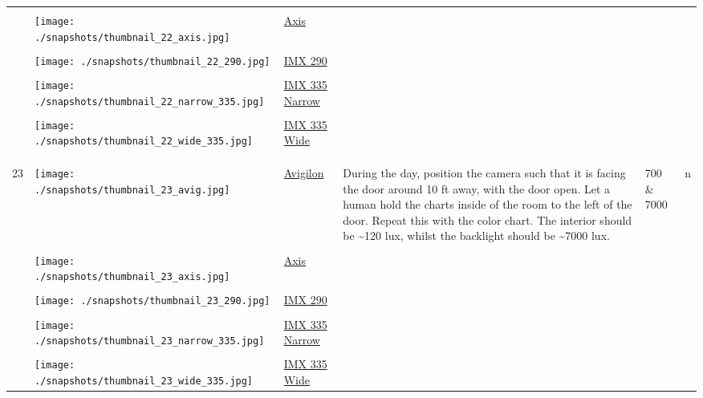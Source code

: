 \documentclass{article}%
\begin{document}
\begin{longtabu}{m{2.5cm} m{4cm} m{2cm} m{4cm} m{2cm} m{2cm}}
&&&&&\\%
&\texttt{[image: ./snapshots/thumbnail\_22\_axis.jpg]}&\href{https://drive.google.com/file/d/1QE_D4jp30H5IkQ-CFucln0C0tDE3zuZd/view?usp=sharing}{Axis}&&&\\%
&&&&&\\%
&\texttt{[image: ./snapshots/thumbnail\_22\_290.jpg]}&\href{https://drive.google.com/file/d/1QqgNPHyQwv9j8qK46wD3WE18JhpdGj23/view?usp=sharing}{IMX 290}&&&\\%
&&&&&\\%
&\texttt{[image: ./snapshots/thumbnail\_22\_narrow\_335.jpg]}&\href{https://drive.google.com/file/d/1tzpYV7sOVIPM0OkLSnX-huiZMO4an3v1/view?usp=sharing}{IMX 335 Narrow}&&&\\%
&&&&&\\%
&\texttt{[image: ./snapshots/thumbnail\_22\_wide\_335.jpg]}&\href{https://drive.google.com/file/d/1E1989-HHUTQs4rtA9rb57YyURvBaEC7e/view?usp=sharing}{IMX 335 Wide}&&&\\%
&&&&&\\%
&&&&&\\%
\hline%
&&&&&\\%
23&\texttt{[image: ./snapshots/thumbnail\_23\_avig.jpg]}&\href{https://drive.google.com/file/d/1SsXcva3ULX97691tGevxNvW2xPXNAJB0/view?usp=sharing}{Avigilon}&During the day, position the camera such that it is facing the door around 10 ft away, with the door open. Let a human hold the charts inside of the room to the left of the door. Repeat this with the color chart. The interior should be \textasciitilde{}120 lux, whilst the backlight should be \textasciitilde{}7000 lux.&700 \& 7000&n\\%
&&&&&\\%
&\texttt{[image: ./snapshots/thumbnail\_23\_axis.jpg]}&\href{https://drive.google.com/file/d/1sVZjZFd9rZ0QAYftB59ZnkrirvaVn7Dd/view?usp=sharing}{Axis}&&&\\%
&&&&&\\%
&\texttt{[image: ./snapshots/thumbnail\_23\_290.jpg]}&\href{https://drive.google.com/file/d/1cDIOG2ahsa2VBF78KLo0iCWjs00ULJ4j/view?usp=sharing}{IMX 290}&&&\\%
&&&&&\\%
&\texttt{[image: ./snapshots/thumbnail\_23\_narrow\_335.jpg]}&\href{https://drive.google.com/file/d/1AMvVH1A-t4cgut9D5l5XLHtFylFwfj5-/view?usp=sharing}{IMX 335 Narrow}&&&\\%
&&&&&\\%
&\texttt{[image: ./snapshots/thumbnail\_23\_wide\_335.jpg]}&\href{https://drive.google.com/file/d/1gd1tsMKcqEoZf9R46AxxJIV6uYMmlMj2/view?usp=sharing}{IMX 335 Wide}&&&\\%

\end{longtabu}
\end{document}
